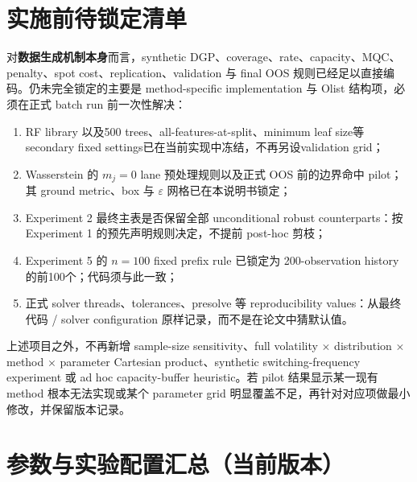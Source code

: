 \documentclass[11pt,a4paper]{ctexart}
\begin{document}
\section{实施前待锁定清单}

对\textbf{数据生成机制本身}而言，synthetic DGP、coverage、rate、capacity、MQC、penalty、spot cost、replication、validation 与 final OOS 规则已经足以直接编码。仍未完全锁定的主要是 method-specific implementation 与 Olist 结构项，必须在正式 batch run 前一次性解决：
\begin{enumerate}[leftmargin=2.4em,itemsep=0.24em]
\item RF library 以及500 trees、all-features-at-split、minimum leaf size等secondary fixed settings已在当前实现中冻结，不再另设validation grid；
\item Wasserstein 的 $m_j=0$ lane 预处理规则以及正式 OOS 前的边界命中 pilot；其 ground metric、box 与 $\varepsilon$ 网格已在本说明书锁定；
\item Experiment 2 最终主表是否保留全部 unconditional robust counterparts：按 Experiment 1 的预先声明规则决定，不提前 post-hoc 剪枝；
\item Experiment 5 的 $n=100$ fixed prefix rule 已锁定为 200-observation history 的前100个；代码须与此一致；
\item 正式 solver threads、tolerances、presolve 等 reproducibility values：从最终代码 / solver configuration 原样记录，而不是在论文中猜默认值。
\end{enumerate}

上述项目之外，不再新增 sample-size sensitivity、full volatility $\times$ distribution $\times$ method $\times$ parameter Cartesian product、synthetic switching-frequency experiment 或 ad hoc capacity-buffer heuristic。若 pilot 结果显示某一现有 method 根本无法实现或某个 parameter grid 明显覆盖不足，再针对对应项做最小修改，并保留版本记录。

\section{参数与实验配置汇总（当前版本）}
\end{document}
